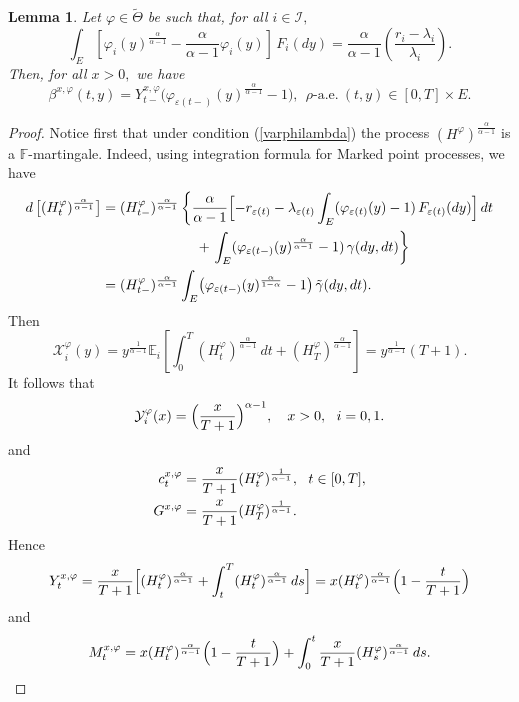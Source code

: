 \documentclass[11pt]{article}
\theoremstyle{plain}
\newtheorem{lemma}[theorem]{Lemma}
\theoremstyle{definition}
\numberwithin{equation}{section}
\newcommand{\Y}{\mathcal{Y}}
\newcommand{\calX}{\mathcal{X}}
\newcommand{\eps}{\varepsilon}
\newcommand{\Exp}{\mathds{E}}
\newcommand{\Fil}{\mathds{F}}
\begin{document}
\begin{lemma}\label{betapower}
Let $\varphi\in\tilde{\Theta}$ be such that, for all $i\in \mathcal{I},$
\begin{equation}\label{varphilambda}
\int_E\left[\varphi_i(y)^{\frac{\alpha}{\alpha-1}}-\frac{\alpha}{\alpha-1}\varphi_i(y)\right]\,F_i(dy)=\frac{\alpha}{\alpha-1}\left(\frac{r_i-\lambda_i}{\lambda_i}\right).
\end{equation}
Then, for all $x>0,$ we have
\[
\beta^{x,\varphi}(t,y)= Y_{t-}^{x,\varphi}\bigl(\varphi_{\eps(t-)}(y)^{\frac{\alpha}{\alpha-1}}-1\bigr), \ \ \rho\mbox{-a.e.} \  (t,y)\in [0,T]\times E.
\]
\end{lemma}
\begin{proof}
Notice first that under condition (\ref{varphilambda}) the process $(H^\varphi)^{\frac{\alpha}{\alpha-1}}$ is a $\Fil$-martingale. Indeed, using integration formula for Marked point processes, we have
\begin{align*}
d\left[(H_t^\varphi)^{\frac{\alpha}{\alpha-1}}\right]
&=(H_{t-}^\varphi)^{\frac{\alpha}{\alpha-1}}\left\{\frac{\alpha}{\alpha-1}\Bigl[-r_{\eps(t)}-\lambda_{\eps(t)}\int_E(\varphi_{\eps(t)}(y)-1)\,F_{\eps(t)}(dy)\Bigr]\,dt\right.\\
&\phantom{AAAAAAAAA}+\left.\int_E(\varphi_{\eps(t-)}(y)^{\frac{\alpha}{\alpha-1}}-1)\,\gamma(dy,dt)\right\}\\
&=(H_{t-}^\varphi)^{\frac{\alpha}{\alpha-1}} \int_E\bigl(\varphi_{\eps(t-)}(y)^{\frac{\alpha}{1-\alpha}}-1\bigr)\,\tilde\gamma(dy,dt).
\end{align*}
Then
\begin{equation*}
\calX_i^\varphi(y)=y^{\frac{1}{\alpha-1}}\Exp_i\left[\int_0^T (H_t^\varphi)^{\frac{\alpha}{\alpha-1}}\,dt+(H_T^\varphi)^{\frac{\alpha}{\alpha-1}}\right]=y^{\frac{1}{\alpha-1}}(T+1).
\end{equation*}
It follows that
\[
\Y_i^{\varphi}(x)=\Bigl(\frac{x}{T+1}\Bigr)^{\alpha-1}, \quad x>0, \ \ i=0,1.
\]
and
\begin{align}
  c_t^{x,\varphi} &=\frac{x}{T+1}(H_t^\varphi)^{\frac{1}{\alpha-1}}, \ \ t\in [0,T],\label{cpower}\\
  G^{x,\varphi}&=\frac{x}{T+1}(H_T^\varphi)^{\frac{1}{\alpha-1}}.\notag
\end{align}
Hence
\[
Y_t^{x,\varphi}=\frac{x}{T+1}\Bigl[(H_t^\varphi)^{\frac{\alpha}{\alpha-1}}+\int_t^T(H_t^\varphi)^{\frac{\alpha}{\alpha-1}}\,ds\Bigr]=x (H_t^\varphi)^{\frac{\alpha}{\alpha-1}}\Bigl(1-\frac{t}{T+1}\Bigr)
\]
and
\[
M_t^{x,\varphi}=x (H_t^\varphi)^{\frac{\alpha}{\alpha-1}}\Bigl(1-\frac{t}{T+1}\Bigr)+\int_0^t\frac{x}{T+1}(H_s^\varphi)^{\frac{\alpha}{\alpha-1}}\,ds.
\]
\end{proof}
\end{document}
